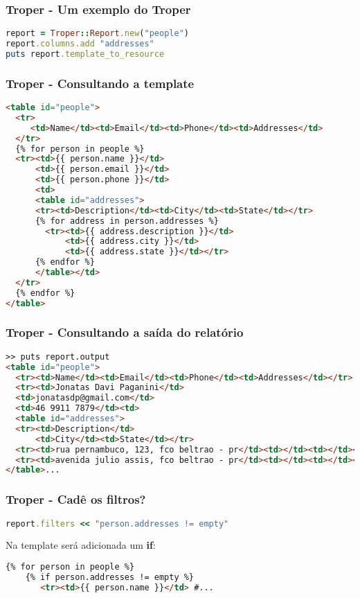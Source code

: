 \documentclass{beamer}
\begin{document}
\begin{frame}[fragile]
\frametitle{Troper - Um exemplo do Troper} 
\begin{lstlisting}[language=ruby, caption=Usando o Troper]
report = Troper::Report.new("people")
report.columns.add "addresses"
puts report.template_to_resource
\end{lstlisting}
\end{frame}

\begin{frame}[fragile]
\frametitle{Troper - Consultando a template} 
\begin{lstlisting}[language=html, caption=Resultado do puts anterior]
<table id="people">
  <tr>
     <td>Name</td><td>Email</td><td>Phone</td><td>Addresses</td>
  </tr>
  {% for person in people %}
  <tr><td>{{ person.name }}</td>
      <td>{{ person.email }}</td>
      <td>{{ person.phone }}</td>
      <td>
      <table id="addresses">
      <tr><td>Description</td><td>City</td><td>State</td></tr>
      {% for address in person.addresses %}
        <tr><td>{{ address.description }}</td>
            <td>{{ address.city }}</td>
            <td>{{ address.state }}</td></tr>
      {% endfor %}
      </table></td>
  </tr>
  {% endfor %}
</table>
\end{lstlisting}
\end{frame}

\begin{frame}[fragile]
\frametitle{Troper - Consultando a saída do relatório} 
\begin{lstlisting}[language=html, caption=report.output]
>> puts report.output
<table id="people">
  <tr><td>Name</td><td>Email</td><td>Phone</td><td>Addresses</td></tr>
  <tr><td>Jonatas Davi Paganini</td>
  <td>jonatasdp@gmail.com</td>
  <td>46 9911 7879</td><td>
  <table id="addresses">
  <tr><td>Description</td>
      <td>City</td><td>State</td></tr>
  <tr><td>rua pernambuco, 123, fco beltrao - pr</td><td></td><td></td></tr>
  <tr><td>avenida julio assis, fco beltrao - pr</td><td></td><td></td></tr>
</table>...
\end{lstlisting}
\end{frame}

\begin{frame}[fragile]
\frametitle{Troper - Cadê os filtros?} 
\begin{lstlisting}[language=ruby, caption=Adicionando filtros]
report.filters << "person.addresses != empty"
\end{lstlisting}

Na template será adicionada um \textbf{if}:

\begin{lstlisting}[language=html, caption=Exibindo na template]
  {% for person in people %}
    {% if person.addresses != empty %}
       <tr><td>{{ person.name }}</td> #...
\end{lstlisting}
\end{frame}
\end{document}
